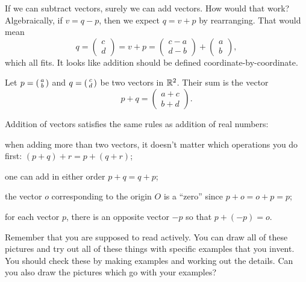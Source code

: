 \documentclass[00-livre-main.tex]{subfiles}
\begin{document}
If we can subtract vectors, surely we can add vectors. How would that work? Algebraically, if $v=q-p$, then we expect $q=v+p$ by rearranging.
That would mean
\[
q = \begin{pmatrix} c \\ d \end{pmatrix} = v+p = \begin{pmatrix} c-a \\ d-b \end{pmatrix} + \begin{pmatrix} a \\ b \end{pmatrix},
\]
which all fits. It looks like addition should be defined coordinate-by-coordinate.

\begin{definition}
Let $p = \left(\begin{smallmatrix} a \\ b \end{smallmatrix}\right)$ and $q= \left(\begin{smallmatrix} c \\ d \end{smallmatrix}\right)$ be two vectors in $\mathbb{R}^2$. Their sum is the vector
\[
p+q = \begin{pmatrix} a+c \\ b+d\end{pmatrix}.
\]
\end{definition}

\begin{theorem}\label{thm:vect-add}
Addition of vectors satisfies the same rules as addition of real numbers:
\begin{compactitem}
\item when adding more than two vectors, it doesn't matter which operations you do first:
$(p+q)+r = p + (q+r)$;
\item one can add in either order $p+q = q+p$;
\item the vector $o$ corresponding to the origin $O$ is a ``zero'' since $p+o = o+p = p$;
\item for each vector $p$, there is an opposite vector $-p$ so that $p + (-p) = o$.
\end{compactitem}
\end{theorem}

Remember that you are supposed to read actively.
You can draw all of these pictures and try out all of these things with specific examples that you invent.
You should check these by making examples and working out the details.
Can you also draw the pictures which go with your examples?
\end{document}
